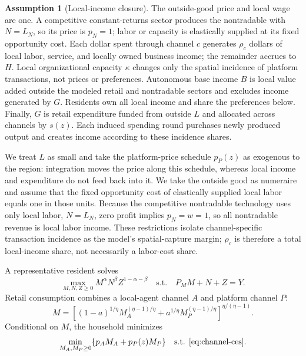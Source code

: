 \documentclass[11pt]{article}
\theoremstyle{plain}
\theoremstyle{definition}
\newtheorem{assumption}{Assumption}
\begin{document}
\begin{assumption}[Local-income closure]
\label{ass:closure}
The outside-good price and local wage are one. A competitive constant-returns
sector produces the nontradable with \(N=L_N\), so its price is \(p_N=1\);
labor or capacity is elastically supplied at its fixed opportunity cost. Each dollar
spent through channel \(c\) generates \(\rho_c\) dollars of local labor,
service, and locally owned business income; the remainder accrues to \(H\).
Local organizational capacity \(\kappa\) changes only the spatial incidence of
platform transactions, not prices or preferences. Autonomous base income \(B\)
is local value added outside the modeled retail and nontradable sectors and
excludes income generated by \(G\). Residents own all local income and share
the preferences below. Finally, \(G\) is retail expenditure funded from
outside \(L\) and allocated across channels by \(s(z)\). Each induced spending
round purchases newly produced output and creates income according to these
incidence shares.
\end{assumption}

We treat \(L\) as small and take the platform-price schedule \(p_P(z)\) as
exogenous to the region: integration moves the price along this schedule,
whereas local income and expenditure do not feed back into it. We take the
outside good as numeraire and assume that the fixed opportunity cost of
elastically supplied local labor equals one in those units. Because the
competitive nontradable technology uses only local labor, \(N=L_N\), zero
profit implies \(p_N=w=1\), so all nontradable revenue is local labor income.
These restrictions isolate channel-specific transaction incidence as the
model's spatial-capture margin; \(\rho_c\) is therefore a total local-income
share, not necessarily a labor-cost share.

A representative resident solves
\begin{equation}
 \max_{M,N,Z\geq0} M^\alpha N^\beta Z^{1-\alpha-\beta}
 \quad\text{s.t.}\quad P_MM+N+Z=Y.
 \label{eq:outer-problem}
\end{equation}
Retail consumption combines a local-agent channel \(A\) and platform channel
\(P\):
\begin{equation}
 M=\left[(1-a)^{1/\eta}M_A^{(\eta-1)/\eta}
 +a^{1/\eta}M_P^{(\eta-1)/\eta}\right]^{\eta/(\eta-1)}.
 \label{eq:channel-ces}
\end{equation}
Conditional on \(M\), the household minimizes
\begin{equation}
 \min_{M_A,M_P\geq0}\{p_AM_A+p_P(z)M_P\}
 \quad\text{s.t. \eqref{eq:channel-ces}.}
 \label{eq:inner-problem}
\end{equation}
\end{document}
